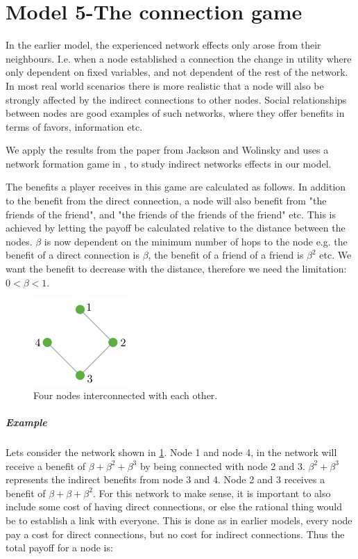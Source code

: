 \section{Model 5-The connection game}
In the earlier model, the experienced network effects only arose from their neighbours. I.e. when a node established a connection the change in utility where only dependent on fixed variables, and not dependent of the rest of the network. In most real world scenarios there is more realistic that a node will also be strongly affected by the indirect connections to other nodes. Social relationships between nodes are good examples of such networks, where they offer benefits in terms of favors, information etc. 

We apply the results from the paper from Jackson and Wolinsky \cite{jackson1996strategic} and uses a network formation game in \cite{jackson2005survey}, to study indirect networks effects in our model. 

The benefits a player receives in this game are calculated as follows. In addition to the benefit from the direct connection, a node will also benefit from "the friends of the friend", and "the friends of the friends of the friend" etc. This is achieved by letting the payoff be calculated relative to the distance between the nodes. $\beta$ is now dependent on the minimum number of hops to the node e.g. the benefit of a direct connection is $\beta$, the benefit of a friend of a friend is $\beta^2$ etc. We want the benefit to decrease with the distance, therefore we need the limitation: $0<\beta<1$. 
\begin{figure}[h]
\centering
  \includegraphics[width=0.2\linewidth]{../Figures/connectionGame.png}
  \caption{\label{fig:connectionGame} Four nodes interconnected with each other.}
\end{figure}
\subparagraph{Example}Lets consider the network shown in \ref{fig:connectionGame}. Node 1 and node 4, in the network will receive a benefit of $\beta+\beta^{2}+\beta^{3}$ by being connected with node 2 and 3. $\beta^{2}+\beta^{3}$ represents the indirect benefits from node 3 and 4. Node 2 and 3 receives a benefit of $\beta+\beta+\beta^{2}$. For this network to make sense, it is important to also include some cost of having direct connections, or else the rational thing would be to establish a link with everyone. This is done as in earlier models, every node pay a cost for direct connections, but no cost for indirect connections. Thus the total payoff for a node is:

